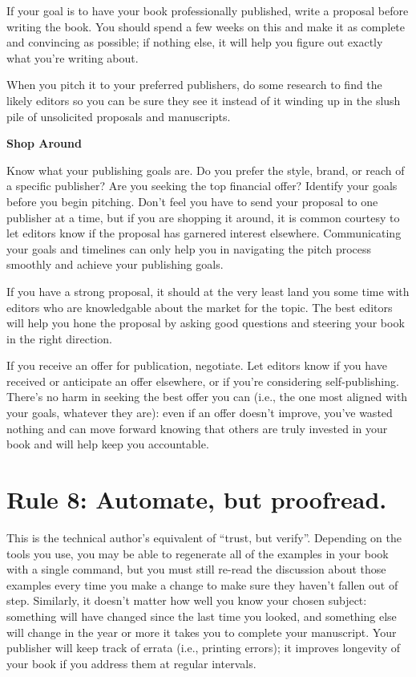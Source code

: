 \documentclass[10pt,letterpaper]{article}
\begin{document}
If your goal is to have your book professionally published, write a
proposal before writing the book.  You should spend a few weeks on
this and make it as complete and convincing as possible; if nothing
else, it will help you figure out exactly what you're writing about.

When you pitch it to your preferred publishers, do some research to
find the likely editors so you can be sure they see it instead of it
winding up in the slush pile of unsolicited proposals and manuscripts.

\begin{mdframed}
\textbf{Shop Around}

\noindent
Know what your publishing goals are.  Do you prefer the style, brand,
or reach of a specific publisher?  Are you seeking the top financial
offer?  Identify your goals before you begin pitching.  Don't feel you
have to send your proposal to one publisher at a time, but if you are
shopping it around, it is common courtesy to let editors know if the
proposal has garnered interest elsewhere.  Communicating your goals
and timelines can only help you in navigating the pitch process
smoothly and achieve your publishing goals.
\end{mdframed}

If you have a strong proposal, it should at the very least land you
some time with editors who are knowledgable about the market for the
topic.  The best editors will help you hone the proposal by asking
good questions and steering your book in the right direction.

If you receive an offer for publication, negotiate.  Let editors know
if you have received or anticipate an offer elsewhere, or if you're
considering self-publishing.  There's no harm in seeking the best
offer you can (i.e., the one most aligned with your goals, whatever
they are): even if an offer doesn't improve, you've wasted nothing and
can move forward knowing that others are truly invested in your book
and will help keep you accountable.

\section*{Rule 8: Automate, but proofread.}

This is the technical author's equivalent of ``trust, but verify''.
Depending on the tools you use, you may be able to regenerate all of
the examples in your book with a single command, but you must still
re-read the discussion about those examples every time you make a
change to make sure they haven't fallen out of step.  Similarly, it
doesn't matter how well you know your chosen subject: something will
have changed since the last time you looked, and something else will
change in the year or more it takes you to complete your manuscript.
Your publisher will keep track of errata (i.e., printing errors); it
improves longevity of your book if you address them at regular
intervals.
\end{document}
